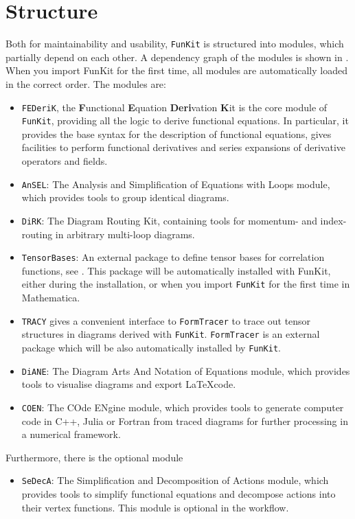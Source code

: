 \documentclass[10pt,prd,nofootinbib,superscriptaddress,twocolumn]{revtex4-2}
\newcommand{\FunKit}{\texttt{FunKit}\xspace}
\newcommand{\FEDeriK}{\texttt{FEDeriK}\xspace}
\newcommand{\DiRK}{\texttt{DiRK}\xspace}
\newcommand{\DiANE}{\texttt{DiANE}\xspace}
\newcommand{\TRACY}{\texttt{TRACY}\xspace}
\newcommand{\SeDecA}{\texttt{SeDecA}\xspace}
\newcommand{\AnSEL}{\texttt{AnSEL}\xspace}
\newcommand{\COEN}{\texttt{COEN}\xspace}
\newcommand{\TensorBases}{\texttt{TensorBases}\xspace}
\newcommand{\FormTracer}{\texttt{FormTracer}\xspace}
\begin{document}
\section{Structure}
\label{sec:Structure}

Both for maintainability and usability, \FunKit is structured into modules, which partially depend on each other. A dependency graph of the modules is shown in . When you import FunKit for the first time, all modules are automatically loaded in the correct order. The modules are:
%
\begin{itemize}
	\item \FEDeriK, the {\textbf{F}unctional \textbf{E}quation \textbf{Deri}vation \textbf{K}it} is the core module of \FunKit, providing all the logic to derive functional equations. In particular, it provides the base syntax for the description of functional equations, gives facilities to perform functional derivatives and series expansions of derivative operators and fields.
	\item \AnSEL: The Analysis and Simplification of Equations with Loops module, which provides tools to group identical diagrams.
	\item \DiRK: The Diagram Routing Kit, containing tools for momentum- and index-routing in arbitrary multi-loop diagrams.
	\item \TensorBases: An external package to define tensor bases for correlation functions, see \cite{Braun:2025gvq}. This package will be automatically installed with FunKit, either during the installation, or when you import \FunKit for the first time in Mathematica.
	\item \TRACY gives a convenient interface to \FormTracer \cite{Cyrol:2016zqb} to trace out tensor structures in diagrams derived with \FunKit. \FormTracer is an external package which will be also automatically installed by \FunKit.
	\item \DiANE: The Diagram Arts And Notation of Equations module, which provides tools to visualise diagrams and export \LaTeX code.
	\item \COEN: The COde ENgine module, which provides tools to generate computer code in C++, Julia or Fortran from traced diagrams for further processing in a numerical framework.
\end{itemize}
%
Furthermore, there is the optional module
%
\begin{itemize}
	\item \SeDecA: The Simplification and Decomposition of Actions module, which provides tools to simplify functional equations and decompose actions into their vertex functions. This module is optional in the workflow.
\end{itemize}
\end{document}
